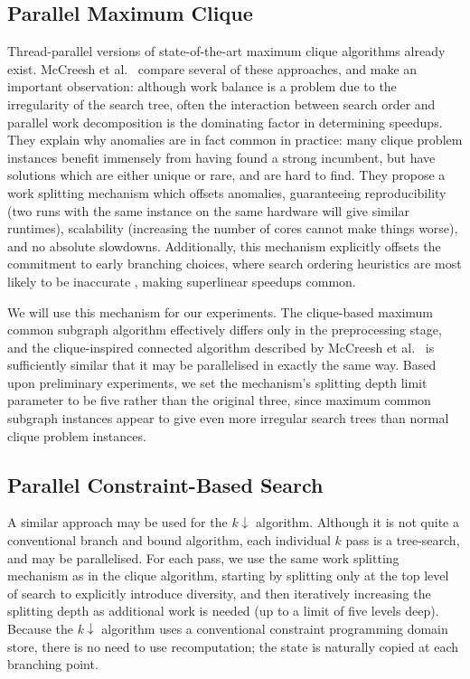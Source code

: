 \documentclass{llncs}
\begin{document}
\subsection{Parallel Maximum Clique}

Thread-parallel versions of state-of-the-art maximum clique algorithms already exist.
McCreesh et al.\ \cite{DBLP:journals/topc/McCreeshP15} compare several of these approaches, and make
an important observation: although work balance is a problem due to the irregularity of the search
tree, often the interaction between search order and parallel work decomposition is the dominating
factor in determining speedups. They explain why anomalies are in fact common in practice: many
clique problem instances benefit immensely from having found a strong incumbent, but have solutions
which are either unique or rare, and are hard to find. They propose a work splitting mechanism which
offsets anomalies, guaranteeing reproducibility (two runs with the same instance on the same
hardware will give similar runtimes), scalability (increasing the number of cores cannot make things
worse), and no absolute slowdowns.  Additionally, this mechanism explicitly offsets the commitment
to early branching choices, where search ordering heuristics are most likely to be inaccurate
\cite{DBLP:conf/ijcai/HarveyG95,DBLP:conf/cp/ChuSS09}, making superlinear speedups common.

We will use this mechanism for our experiments.  The clique-based maximum common subgraph algorithm
effectively differs only in the preprocessing stage, and the clique-inspired connected algorithm
described by McCreesh et al.\ \cite{DBLP:conf/cp/McCreeshNPS16} is sufficiently similar that it may be parallelised in
exactly the same way. Based upon preliminary experiments, we set the mechanism's splitting depth
limit parameter to be five rather than the original three, since maximum common subgraph instances
appear to give even more irregular search trees than normal clique problem instances.

\subsection{Parallel Constraint-Based Search}

A similar approach may be used for the $k{\downarrow}$ algorithm. Although it is not quite a
conventional branch and bound algorithm, each individual $k$ pass is a tree-search, and may be
parallelised. For each pass, we use the same work splitting mechanism as in the clique algorithm,
starting by splitting only at the top level of search to explicitly introduce diversity, and then
iteratively increasing the splitting depth as additional work is needed (up to a limit of five
levels deep).  Because the $k{\downarrow}$ algorithm uses a conventional constraint programming
domain store, there is no need to use recomputation; the state is naturally copied at each branching
point.
\end{document}
